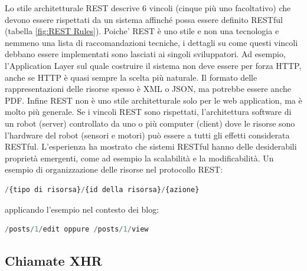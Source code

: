 Lo stile architetturale REST descrive 6 vincoli (cinque più uno facoltativo) che devono essere rispettati da un sistema affinché possa essere definito RESTful (tabella \ref{fig:REST Rules}). Poiche’ REST è uno stile e non una tecnologia e nemmeno una lista di raccomandazioni tecniche, i dettagli su come questi vincoli debbano essere implementati sono lasciati ai singoli sviluppatori. Ad esempio, l'Application Layer sul quale costruire il sistema non deve essere per forza HTTP, anche se HTTP è quasi sempre la scelta più naturale. Il formato delle rappresentazioni delle risorse spesso è XML o JSON, ma potrebbe essere anche PDF. Infine REST non è uno stile architetturale solo per le web application, ma è molto più generale. Se i vincoli REST sono rispettati, l’architettura software di un robot (server) controllato da uno o più computer (client) dove le risorse sono l’hardware del robot (sensori e motori) può essere a tutti gli effetti considerata RESTful.
L'esperienza ha mostrato che sistemi RESTful hanno delle desiderabili proprietà emergenti, come ad esempio la scalabilità e la modificabilità.
Un esempio di organizzazione delle risorse nel protocollo REST:

\begin{lstlisting}[language=php]
	/{tipo di risorsa}/{id della risorsa}/{azione}
\end{lstlisting}

applicando l'esempio nel contesto dei blog:

\begin{lstlisting}[language=php]
	/posts/1/edit oppure /posts/1/view
\end{lstlisting}

\subsection{Chiamate XHR}


